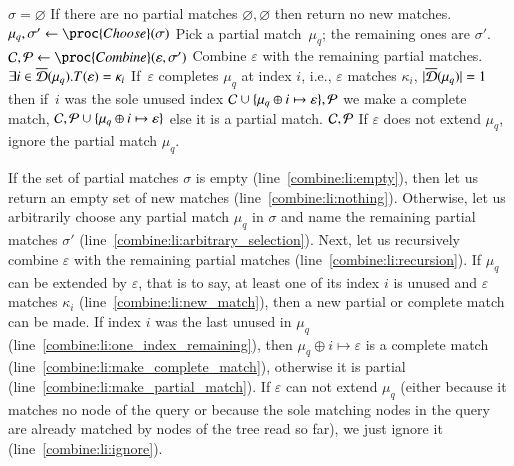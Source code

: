 \begin{codebox}
\li	\If \(\sigma = \varnothing\)
\label{combine:li:empty}
\RComment If there are no partial matches
\li	\Then \Return \(\varnothing, \varnothing\)
\label{combine:li:nothing}
\RComment then return no new matches.
	\End
\li	\(\mu_q, \sigma' \gets \proc{Choose} (\sigma)\)
\label{combine:li:arbitrary_selection}
\RComment Pick a partial match~\(\mu_q\); the remaining ones are \(\sigma'\).
\li \({\cal C}, {\cal P} \gets
      \proc{Combine} (\varepsilon, \sigma')\)
\label{combine:li:recursion}
\RComment Combine \(\varepsilon\) with the remaining partial matches.
\li	\If \(\exists i \in \overline{\cal D}(\mu_q).T(\varepsilon) = \kappa_i\)
\label{combine:li:new_match}
\RComment If~\(\varepsilon\) completes \(\mu_q\) at index \(i\),
i.e., \(\varepsilon\) matches \(\kappa_i\),
\li	\Then \If \(|\overline{\cal D}(\mu_q)| = 1\)
\label{combine:li:one_index_remaining}
\RComment then if~\(i\) was the sole unused index
\li       \Then \Return \({\cal C} \cup \{\mu_q \oplus i \mapsto
                          \varepsilon\}, {\cal P}\)
\label{combine:li:make_complete_match}
\RComment we make a complete match,
          \End
\li       \Return \({\cal C},
                     {\cal P} \cup \{\mu_q \oplus i \mapsto
                     \varepsilon\}\)
\label{combine:li:make_partial_match}
\RComment else it is a partial match.
\End
\li\Return \({\cal C}, {\cal P}\)
\label{combine:li:ignore}
\RComment If \(\varepsilon\) does not extend \(\mu_q\), ignore the
partial match \(\mu_q\).
\end{codebox}
If the set of partial matches \(\sigma\) is empty
(line~\ref{combine:li:empty}), then let us return an empty set of new
matches (line~\ref{combine:li:nothing}). Otherwise, let us arbitrarily
choose any partial match \(\mu_q\) in \(\sigma\) and name the
remaining partial matches \(\sigma'\)
(line~\ref{combine:li:arbitrary_selection}). Next, let us recursively
combine \(\varepsilon\) with the remaining partial matches
(line~\ref{combine:li:recursion}). If \(\mu_q\) can be extended by
\(\varepsilon\), that is to say, at least one of its index \(i\) is
unused and \(\varepsilon\) matches \(\kappa_i\)
(line~\ref{combine:li:new_match}), then a new partial or complete
match can be made. If index \(i\) was the last unused in \(\mu_q\)
(line~\ref{combine:li:one_index_remaining}), then \(\mu_q \oplus i
\mapsto \varepsilon\) is a complete match
(line~\ref{combine:li:make_complete_match}), otherwise it is partial
(line~\ref{combine:li:make_partial_match}). If \(\varepsilon\) can not
extend \(\mu_q\) (either because it matches no node of the query or
because the sole matching nodes in the query are already matched by
nodes of the \XML tree read so far), we just ignore it
(line~\ref{combine:li:ignore}).


